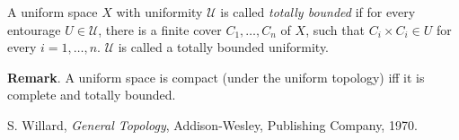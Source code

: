 \documentclass[12pt]{article}
\begin{document}
A uniform space $X$ with uniformity $\mathcal{U}$ is called \emph{totally bounded} if for every entourage $U\in \mathcal{U}$, there is a finite cover $C_1,\ldots,C_n$ of $X$, such that $C_i\times C_i\in U$ for every $i=1,\ldots,n$.  $\mathcal{U}$ is called a totally bounded uniformity.

\textbf{Remark}.  A uniform space is compact (under the uniform topology) iff it is complete and totally bounded.

\begin{thebibliography}{9}
 S. Willard, \emph{General Topology},
Addison-Wesley, Publishing Company, 1970.
\end{thebibliography}
\end{document}
